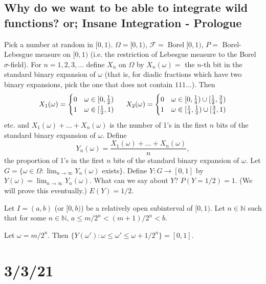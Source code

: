\documentclass{article}
\DeclareMathOperator{\Borel}{Borel}
\newcommand{\N}{\mathbb{N}}
\newcommand{\F}{\mathscr{F}}
\theoremstyle{definition}
\begin{document}
\subsection*{Why do we want to be able to integrate wild functions? or; Insane Integration - Prologue}

Pick a number at random in $[0, 1)$. $\Omega = [0,1)$, $\F = \Borel[0,1)$, $P =$ Borel-Lebesgue measure on $[0,1)$ (i.e. the restriction of Lebesgue measure to the Borel $\sigma$-field).
For $n = 1, 2, 3, \dots$ define $X_n$ on $\Omega$ by $X_n(\omega) =$ the $n$-th bit in the standard binary expansion of $\omega$ (that is, for diadic fractions which have two binary expansions, pick the one that does not contain $111\dots$).
Then
\[
    X_1(\omega) = \begin{cases}
        0 & \omega \in [0, \frac{1}{2}) \\
        1 & \omega \in [\frac{1}{2}, 1)
    \end{cases} \hspace{.5cm}
    X_2(\omega) = \begin{cases}
        0 & \omega \in [0, \frac{1}{4}) \cup [\frac{1}{2}, \frac{3}{4}) \\
        1 & \omega \in [\frac{1}{4}, \frac{1}{2}) \cup [\frac{3}{4}, 1)
    \end{cases}
\]
etc. and $X_1(\omega) + \dots + X_n(\omega)$ is the number of 1's in the first $n$ bits of the standard binary expansion of $\omega$. Define
\[
    Y_n(\omega) = \frac{X_1(\omega) + \dots + X_n(\omega)}{n},
\]
the proportion of 1's in the first $n$ bits of the standard binary expansion of $\omega$. Let $G = \{\omega \in \Omega : \lim_{n\to\infty} Y_n(\omega)$ exists$\}$. %
Define $Y : G \longrightarrow [0,1]$ by $Y(\omega) = \lim_{n\to\infty} Y_n(\omega)$. What can we say about $Y$? $P(Y = 1/2) = 1$. (We will prove this eventually.) $E(Y) = 1/2$.

Let $I = (a,b)$ (or $[0,b)$) be a relatively open subinterval of $[0,1)$. Let $n \in \N$ such that for some $n \in \N$, $a \leq m/2^n < (m+1)/2^n < b$.


Let $\omega = m/2^n$. Then $\{Y(\omega') : \omega \leq \omega' \leq \omega+1/2^n\} = [0,1]$.

\section*{3/3/21}
\end{document}
